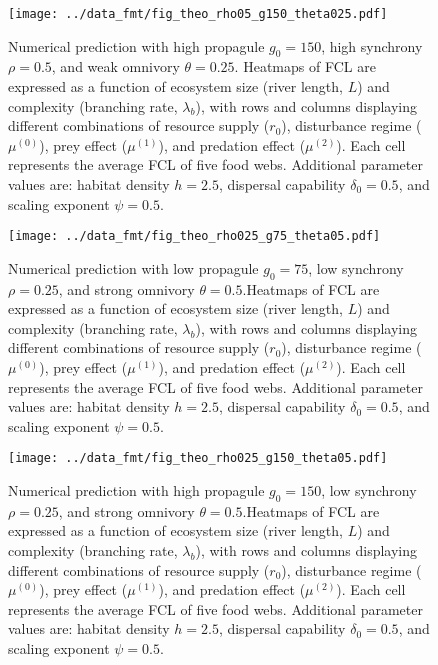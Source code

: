 \newpage

\begin{figure}
\centering
\texttt{[image: ../data\_fmt/fig\_theo\_rho05\_g150\_theta025.pdf]}
\caption{\label{fig:fig-num4}Numerical prediction with high propagule
\(g_0 = 150\), high synchrony \(\rho = 0.5\), and weak omnivory
\(\theta = 0.25\). Heatmaps of FCL are expressed as a function of
ecosystem size (river length, \(L\)) and complexity (branching rate,
\(\lambda_b\)), with rows and columns displaying different combinations
of resource supply (\(r_0\)), disturbance regime (\(\mu^{(0)}\)), prey
effect (\(\mu^{(1)}\)), and predation effect (\(\mu^{(2)}\)). Each cell
represents the average FCL of five food webs. Additional parameter
values are: habitat density \(h=2.5\), dispersal capability
\(\delta_0=0.5\), and scaling exponent \(\psi=0.5\).}
\end{figure}

\newpage

\begin{figure}
\centering
\texttt{[image: ../data\_fmt/fig\_theo\_rho025\_g75\_theta05.pdf]}
\caption{\label{fig:fig-num5}Numerical prediction with low propagule
\(g_0 = 75\), low synchrony \(\rho = 0.25\), and strong omnivory
\(\theta = 0.5\).Heatmaps of FCL are expressed as a function of
ecosystem size (river length, \(L\)) and complexity (branching rate,
\(\lambda_b\)), with rows and columns displaying different combinations
of resource supply (\(r_0\)), disturbance regime (\(\mu^{(0)}\)), prey
effect (\(\mu^{(1)}\)), and predation effect (\(\mu^{(2)}\)). Each cell
represents the average FCL of five food webs. Additional parameter
values are: habitat density \(h=2.5\), dispersal capability
\(\delta_0=0.5\), and scaling exponent \(\psi=0.5\).}
\end{figure}

\newpage

\begin{figure}
\centering
\texttt{[image: ../data\_fmt/fig\_theo\_rho025\_g150\_theta05.pdf]}
\caption{\label{fig:fig-num6}Numerical prediction with high propagule
\(g_0 = 150\), low synchrony \(\rho = 0.25\), and strong omnivory
\(\theta = 0.5\).Heatmaps of FCL are expressed as a function of
ecosystem size (river length, \(L\)) and complexity (branching rate,
\(\lambda_b\)), with rows and columns displaying different combinations
of resource supply (\(r_0\)), disturbance regime (\(\mu^{(0)}\)), prey
effect (\(\mu^{(1)}\)), and predation effect (\(\mu^{(2)}\)). Each cell
represents the average FCL of five food webs. Additional parameter
values are: habitat density \(h=2.5\), dispersal capability
\(\delta_0=0.5\), and scaling exponent \(\psi=0.5\).}
\end{figure}

